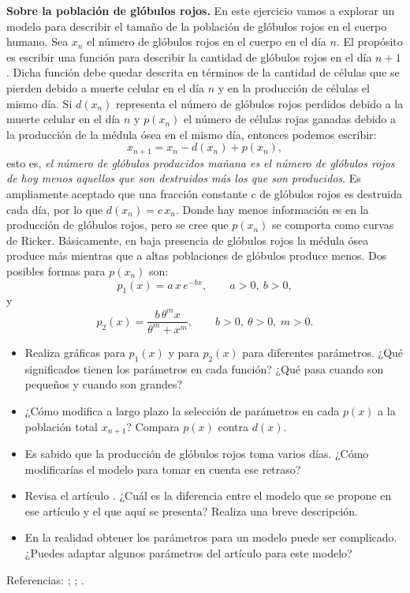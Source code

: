 \setcounter{ejercicio}{1}   %
\begin{ejercicio}[Tipo 1]\label{ej:globulos}
\textbf{Sobre la población de glóbulos rojos.}
En este ejercicio vamos a explorar un modelo para describir el tamaño de la
población de glóbulos rojos en el cuerpo humano. Sea $x_n$ el número de glóbulos
rojos en el cuerpo en el día $n$. El propósito es escribir una función para
describir la cantidad de glóbulos rojos en el día $n+1$. Dicha función debe
quedar descrita en términos de la cantidad de células que se pierden debido a
muerte celular en el día $n$ y en la producción de células el mismo día. Si
$d(x_n)$ representa el número de glóbulos rojos perdidos debido a la muerte
celular en el día $n$ y $p(x_n)$ el número de células rojas ganadas debido a la
producción de la médula ósea en el mismo día, entonces podemos escribir:
\begin{equation}\label{eq:globulos}
  x_{n+1} = x_n - d(x_n) + p(x_n),
\end{equation}
esto es, \emph{el número de glóbulos producidos mañana es el número de glóbulos
rojos de hoy menos aquellos que son destruidos más los que son producidos}. Es
ampliamente aceptado que una fracción constante $c$ de glóbulos rojos es
destruida cada día, por lo que $d(x_n) = c\,x_n$. Donde hay menos información es
en la producción de glóbulos rojos, pero se cree que $p(x_n)$ se comporta como
curvas de Ricker. Básicamente, en baja presencia de glóbulos rojos la médula
ósea produce más mientras que a altas poblaciones de glóbulos produce menos. Dos
posibles formas para $p(x_n)$ son:
\[
  p_1(x) = a\,x\,e^{-bx}, \qquad a>0,\ b>0,
\]
y
\[
  p_2(x) = \frac{b\,\theta^m x}{\theta^m + x^m}, \qquad b>0,\ \theta>0,\ m>0.
\]
\begin{itemize}
  \item Realiza gráficas para $p_1(x)$ y para $p_2(x)$ para diferentes
    parámetros. ¿Qué significados tienen los parámetros en cada función? ¿Qué
    pasa cuando son pequeños y cuando son grandes?
  \item ¿Cómo modifica a largo plazo la selección de parámetros en cada $p(x)$
    a la población total $x_{n+1}$? Compara $p(x)$ contra $d(x)$.
  \item Es sabido que la producción de glóbulos rojos toma varios días. ¿Cómo
    modificarías el modelo para tomar en cuenta ese retraso?
  \item Revisa el artículo \parencite{tetschke2018}. ¿Cuál es la diferencia
    entre el modelo que se propone en ese artículo y el que aquí se presenta?
    Realiza una breve descripción.
  \item En la realidad obtener los parámetros para un modelo puede ser
    complicado. ¿Puedes adaptar algunos parámetros del artículo para este
    modelo?
\end{itemize}
Referencias: \textcite{devries2006}; \textcite{mackey1977};
\textcite{tetschke2018}.
\end{ejercicio}

